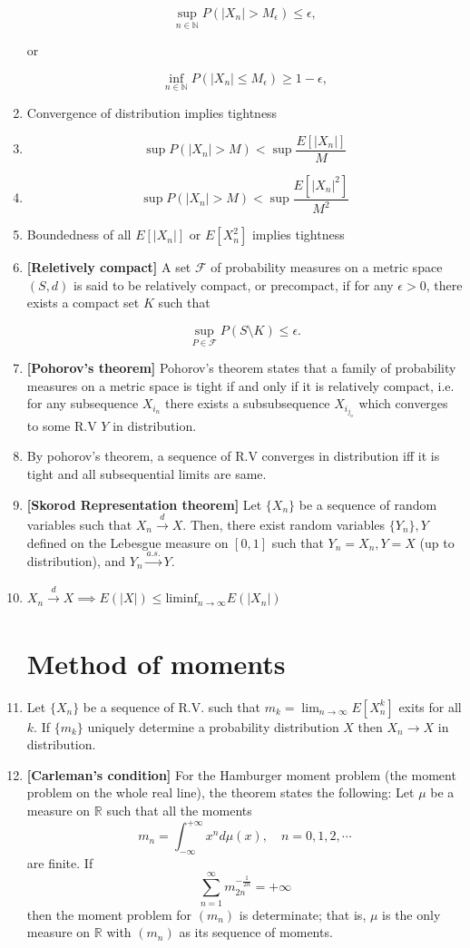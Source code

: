 \documentclass[12pt,oneside]{book}
\begin{document}
\begin{enumerate}
\begin{equation*}
\sup_{n\in\mathbb N} P(|X_n| > M_\epsilon) \leq \epsilon,
\end{equation*}

or


\begin{equation*}
    \inf_{n\in\mathbb N} P(|X_n|\leq  M_\epsilon) \geq1- \epsilon,
\end{equation*}
    
\item Convergence of distribution implies tightness
\item $$\sup P(|X_n|>M)<\sup\frac{E[|X_n|]}{M}$$
\item $$\sup P(|X_n|>M)<\sup\frac{E[|X_n|^2]}{M^2}$$
\item Boundedness of all $E[|X_n|]$ or $E[X_n^2]$ implies tightness
\item \textbf{[Reletively compact]} A set $\mathcal{F}$ of probability measures on a metric space $(S,d)$ is said to be relatively compact, or precompact, if for any $\epsilon > 0$, there exists a compact set $K$ such that

\begin{equation*}
\sup_{P \in \mathcal{F}} P(S \setminus K) \leq \epsilon.
\end{equation*}
\item \textbf{[Pohorov's theorem]} Pohorov's theorem states that a family of probability measures on a metric space is tight if and only if it is relatively compact, i.e. for any subsequence $X_{i_n}$ there exists a subsubsequence $X_{i_{j_n}}$ which converges to some R.V $Y$ in distribution. 
\item By pohorov's theorem, a sequence of R.V  converges in distribution iff it is tight and all subsequential limits are same. 
\item \textbf{[Skorod Representation theorem]} Let $\{X_n\}$ be a sequence of random variables such that $X_n\xrightarrow{d} X$. Then, there exist random variables $\{Y_n\}, Y$ defined on the Lebesgue measure on $[0, 1]$ such that $Y_n=X_n, Y=X$ (up to distribution), and $Y_n\xrightarrow[]{a.s.}Y$.
\item  $X_n\xrightarrow[]{d}X\implies E(|X|)\leq \mathrm{lim inf}_{n\rightarrow\infty}E(|X_n|)$
\section{Method of moments}
\item Let $\{X_n\}$ be a sequence of R.V. such that $m_k=\lim_{n\to\infty}E[X_n^k]$ exits for all $k$. If $\{m_k\}$ uniquely determine a probability distribution $X$ then $X_n\to X$ in distribution.
\item \textbf{[Carleman's condition]} For the Hamburger moment problem (the moment problem on the whole real line), the theorem states the following:
Let $\mu$ be a measure on $\mathbb{R}$ such that all the moments
$$
m_n=\int_{-\infty}^{+\infty} x^n d \mu(x), \quad n=0,1,2, \cdots
$$
are finite. If
$$
\sum_{n=1}^{\infty} m_{2 n}^{-\frac{1}{2 n}}=+\infty
$$
then the moment problem for $\left(m_n\right)$ is determinate; that is, $\mu$ is the only measure on $\mathbb{R}$ with $\left(m_n\right)$ as its sequence of moments.


\end{enumerate}
\end{document}
